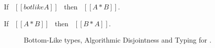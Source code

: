 \begin{comment}
\begin{proof}
  By induction on type A.
  \begin{itemize}
    \item Case $[[Top]]$ requires \Cref{lemma:union:bl-disj}.
    \item Case $[[Bot]]$ is trivial to prove.
    \item Case $[[Int]]$ requires induction on type B and
          \Cref{lemma:union:bl-disj,lemma:union:disj-sym}.
    \item Case $[[A -> B]]$ requires induction on type B and \Cref{lemma:union:disj-sym}.
    \item Case $[[A \/ B]]$ follows directly from inductive hypothesis.
  \end{itemize}
\end{proof}

\begin{lemma}[Bottom-like Types Disjoint]
\label{lemma:union:bl-disj}
  If \ $[[botlike A]]$ \ then: \ $[[A * B]]$.
\end{lemma}

\begin{lemma}[Disjointness Symmetry]
\label{lemma:union:disj-sym}
  If \ $[[A * B]]$ \ then: \ $[[B * A]]$.
\end{lemma}
\end{comment}

\begin{lemma}
  If \ $[[botlike A]]$ \ then \ $[[A * B]]$.
\label{lemma:union:bl-disjoint}
\end{lemma}

\begin{lemma}
  If \ $[[A * B]]$ \ then \ $[[B * A]]$.
\label{lemma:union:disj-sym}
\end{lemma}

\begin{figure}[t]
  \begin{small}
    \centering
  \end{small}
  \begin{small}
    \centering
  \end{small}
  \begin{small}
    \centering
  \end{small}
  \caption{Bottom-Like types, Algorithmic Disjointness and Typing for \cal.}
  \label{fig:union:disj-typ}
\end{figure}


